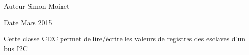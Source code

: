 \begin{DoxyAuthor}{Auteur}
Simon Moinet 
\end{DoxyAuthor}
\begin{DoxyDate}{Date}
Mars 2015
\end{DoxyDate}
Cette classe \hyperlink{class_c_i2_c}{C\+I2\+C} permet de lire/écrire les valeurs de registres des esclaves d'un bus I2\+C 